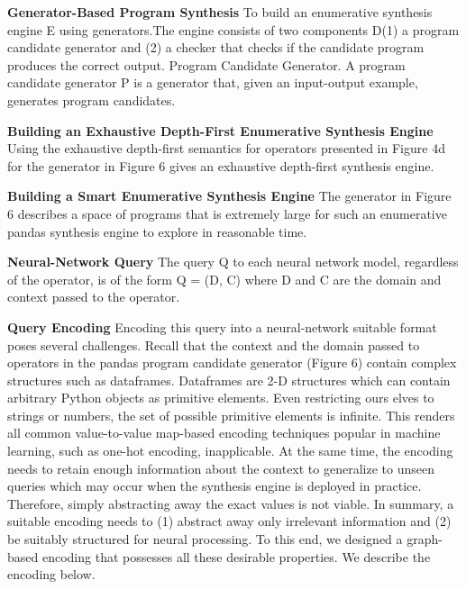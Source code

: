 \documentclass{article}
\begin{document}
\textbf{Generator-Based Program Synthesis} To build an enumerative synthesis engine E using generators.The engine consists of two components D(1) a program candidate generator and (2) a checker that checks if the candidate program produces the correct output. Program Candidate Generator. A program candidate generator P is a generator that, given an input-output example, generates program candidates.

\textbf{Building an Exhaustive Depth-First Enumerative Synthesis Engine} Using the exhaustive depth-first semantics for operators presented in Figure 4d for the generator in Figure 6 gives an exhaustive depth-first synthesis engine. 

\textbf{Building a Smart Enumerative Synthesis Engine} The generator in Figure 6 describes a space of programs that is extremely large for such an enumerative pandas synthesis engine to explore in reasonable time.

\textbf{Neural-Network Query} The query Q to each neural network model, regardless of the operator, is of the form Q = (D, C) where D and C are the domain and context passed to the operator.

\textbf{Query Encoding} Encoding this query into a neural-network suitable format poses several challenges. Recall that the context and the domain passed to operators in the pandas program candidate generator (Figure 6) contain complex structures such as dataframes. Dataframes are 2-D structures which can contain arbitrary Python objects as primitive elements. Even restricting ours elves to strings or numbers, the set of possible primitive elements is infinite. This renders all common value-to-value map-based encoding techniques popular in machine learning, such as one-hot encoding, inapplicable. At the same time, the encoding needs to retain enough information about the context to generalize to unseen queries which may occur when the synthesis engine is deployed in practice. Therefore, simply abstracting away the exact values is not viable. In summary, a suitable encoding needs to (1) abstract away only irrelevant information and (2) be suitably structured for neural processing. To this end, we designed a graph-based encoding that possesses all these desirable properties. We describe the encoding below.
\end{document}
